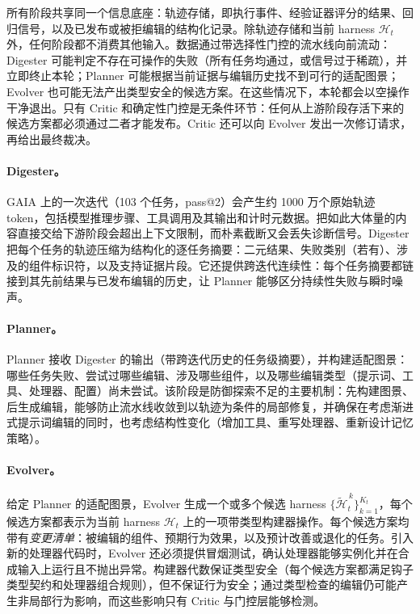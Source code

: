 所有阶段共享同一个信息底座：轨迹存储，即执行事件、经验证器评分的结果、回归信号，以及已发布或被拒编辑的结构化记录。除轨迹存储和当前 harness $\mathcal{H}_t$ 外，任何阶段都不消费其他输入。数据通过带选择性门控的流水线向前流动：Digester 可能判定不存在可操作的失败（所有任务均通过，或信号过于稀疏），并立即终止本轮；Planner 可能根据当前证据与编辑历史找不到可行的适配图景；Evolver 也可能无法产出类型安全的候选方案。在这些情况下，本轮都会以空操作干净退出。只有 Critic 和确定性门控是无条件环节：任何从上游阶段存活下来的候选方案都必须通过二者才能发布。Critic 还可以向 Evolver 发出一次修订请求，再给出最终裁决。

\paragraph{Digester。}
GAIA 上的一次迭代（103 个任务，pass@2）会产生约 1000 万个原始轨迹 token，包括模型推理步骤、工具调用及其输出和计时元数据。把如此大体量的内容直接交给下游阶段会超出上下文限制，而朴素截断又会丢失诊断信号。Digester 把每个任务的轨迹压缩为结构化的逐任务摘要：二元结果、失败类别（若有）、涉及的组件标识符，以及支持证据片段。它还提供跨迭代连续性：每个任务摘要都链接到其先前结果与已发布编辑的历史，让 Planner 能够区分持续性失败与瞬时噪声。

\paragraph{Planner。}
Planner 接收 Digester 的输出（带跨迭代历史的任务级摘要），并构建适配图景：哪些任务失败、尝试过哪些编辑、涉及哪些组件，以及哪些编辑类型（提示词、工具、处理器、配置）尚未尝试。该阶段是防御探索不足的主要机制：先构建图景、后生成编辑，能够防止流水线收敛到以轨迹为条件的局部修复，并确保在考虑渐进式提示词编辑的同时，也考虑结构性变化（增加工具、重写处理器、重新设计记忆策略）。

\paragraph{Evolver。}
给定 Planner 的适配图景，Evolver 生成一个或多个候选 harness $\{\widetilde{\mathcal{H}}_t^{\,k}\}_{k=1}^{K_t}$，每个候选方案都表示为当前 harness $\mathcal{H}_t$ 上的一项带类型构建器操作。每个候选方案均带有\textit{变更清单}：被编辑的组件、预期行为效果，以及预计改善或退化的任务。引入新的处理器代码时，Evolver 还必须提供冒烟测试，确认处理器能够实例化并在合成输入上运行且不抛出异常。构建器代数保证类型安全（每个候选方案都满足钩子类型契约和处理器组合规则），但不保证行为安全；通过类型检查的编辑仍可能产生非局部行为影响，而这些影响只有 Critic 与门控层能够检测。

